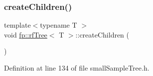 \subsubsection{\texorpdfstring{create\+Children()}{createChildren()}\hspace{0.1cm}{\footnotesize\ttfamily [1/2]}}
{\footnotesize\ttfamily template$<$typename T $>$ \\
void \hyperlink{classfp_1_1rfTree}{fp\+::rf\+Tree}$<$ T $>$\+::create\+Children (\begin{DoxyParamCaption}{ }\end{DoxyParamCaption})\hspace{0.3cm}{\ttfamily [inline]}}



Definition at line 134 of file small\+Sample\+Tree.\+h.


